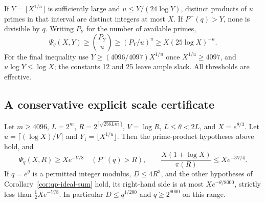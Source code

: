 If
$Y=\lfloor X^{1/u}\rfloor$ is sufficiently large and
$u\leq Y/(24\log Y)$, distinct products of $u$ primes in that
interval are distinct integers at most $X$.  If $P^-(q)>Y$, none is
divisible by $q$.  Writing $P_Y$ for the number of available primes,
\[
 \Psi_q(X,Y)\geq\binom{P_Y}{u}
 \geq(P_Y/u)^u
 \geq X(25\log X)^{-u}.
\]
For the final inequality use
$Y\geq(4096/4097)X^{1/u}$ once $X^{1/u}\geq4097$, and
$u\log Y\leq\log X$; the constants 12 and 25 leave ample slack.
All thresholds are effective.

\subsection{A conservative explicit scale certificate}

\begin{lemma}
\label{lem:qp-explicit-scale}
Let $m\geq4096$, $L=2^m$,
$R=2^{\lceil\sqrt{256Lm}\rceil}$, $V=\log R$,
$L\leq\theta<2L$, and $X=e^{\theta/3}$.
Let $u=\lceil(\log X)/V\rceil$ and
$Y_1=\lfloor X^{1/u}\rfloor$.  Then the prime-product hypotheses
above hold, and
\[
 \Psi_q(X,R)\geq Xe^{-V/8}\quad(P^-(q)>R),
 \qquad
 \frac{X(1+\log X)}{\pi(R)}\leq Xe^{-3V/4}.
\]
If $q=e^\theta$ is a permitted integer modulus, $D\leq4R^3$, and
the other hypotheses of Corollary~\ref{cor:qp-ideal-sum} hold, its
right-hand side is at most $Xe^{-\theta/8000}$, strictly less than
$\frac12Xe^{-V/8}$.  In particular $D\leq q^{1/200}$ and
$q\geq2^{8000}$ on this range.
\end{lemma}

